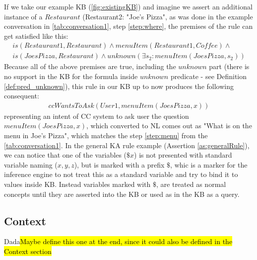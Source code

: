 If we take our example KB (\autoref{fig:existingKB}) and imagine we assert
an additional instance of a $Restaurant$ (Restaurant2: "Joe’s Pizza", as was 
done in the example conversation in \autoref{tab:conversation1}, 
step \ref{step:where}, the premises of the rule can get satisfied like this:
\begin{equation}\label{as:generalRuleantecedent}
\begin{gathered}
is(Restaurant1,Restaurant) \land menuItem(Restaurant1,Coffee)\land \\
	is(JoesPizza,Restaurant) \land unknown(\exists s_2:menuItem(JoesPizza,s_2))
\end{gathered}
\end{equation}
Because all of the above premises are true, including the $unknown$ part
(there is no support in the KB for the formula inside $unknown$ predicate - see 
Definition \autoref{def:pred_unknown}), this rule in our KB up to now produces the 
following consequent:
\begin{equation}\label{as:generalRuleConsequent}
\begin{gathered}
	ccWantsToAsk(User1,menuItem(JoesPizza,x))
\end{gathered}
\end{equation}
representing an intent of CC system to ask user the question 
$menuItem(JoesPizza,x)$, which converted to NL comes out as "What is on the menu
in Joe's Pizza", which matches the step \ref{step:menu} from the 
\autoref{tab:conversation1}. In the general KA rule example (Assertion 
\ref{as:generalRule}), we can notice that one of the variables ($\$x$) is not 
presented with standard variable naming ($x,y,z$), but is marked with a prefix 
$\$$, whic is a marker for the inference engine to not treat this as a standard
variable and try to bind it to values inside KB. Instead variables marked with
$\$$, are treated as normal concepts until they are asserted into the KB or used
as in the KB as a query. 


\subsection{Context}
\begin{definition}
\label{pred:probableUserLocation}
Dada\hl{Maybe define this one at the end, since it could also be defined in the
Context section}
\end{definition}
